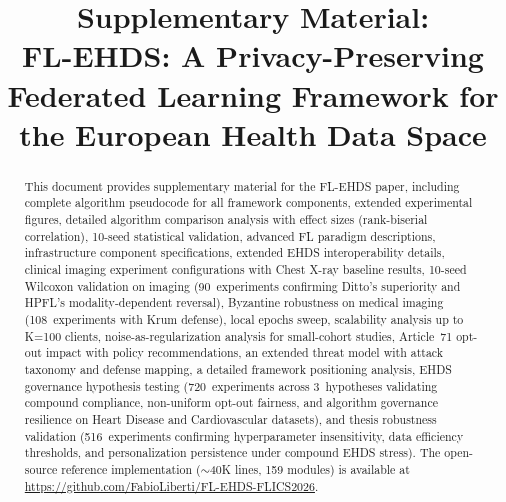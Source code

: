 \documentclass[conference]{IEEEtran}
\begin{document}
\renewcommand{\thetable}{S-\Roman{table}}
\renewcommand{\thefigure}{S-\arabic{figure}}

\title{Supplementary Material:\\FL-EHDS: A Privacy-Preserving Federated Learning Framework for the European Health Data Space}

\author{
}

\maketitle

\begin{abstract}
This document provides supplementary material for the FL-EHDS paper, including complete algorithm pseudocode for all framework components, extended experimental figures, detailed algorithm comparison analysis with effect sizes (rank-biserial correlation), 10-seed statistical validation, advanced FL paradigm descriptions, infrastructure component specifications, extended EHDS interoperability details, clinical imaging experiment configurations with Chest X-ray baseline results, 10-seed Wilcoxon validation on imaging (90~experiments confirming Ditto's superiority and HPFL's modality-dependent reversal), Byzantine robustness on medical imaging (108~experiments with Krum defense), local epochs sweep, scalability analysis up to K=100 clients, noise-as-regularization analysis for small-cohort studies, Article~71 opt-out impact with policy recommendations, an extended threat model with attack taxonomy and defense mapping, a detailed framework positioning analysis, EHDS governance hypothesis testing (720~experiments across 3~hypotheses validating compound compliance, non-uniform opt-out fairness, and algorithm governance resilience on Heart Disease and Cardiovascular datasets), and thesis robustness validation (516~experiments confirming hyperparameter insensitivity, data efficiency thresholds, and personalization persistence under compound EHDS stress). The open-source reference implementation ($\sim$40K lines, 159 modules) is available at \url{https://github.com/FabioLiberti/FL-EHDS-FLICS2026}.
\end{abstract}
\end{document}
